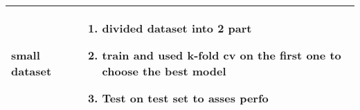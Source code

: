       \begin{table}[!h]
    \begin{center}
    \begin{tabular}{| m{8em}| m{15em}|}
    \hline
     \rowcolor{vert.g} \textbf{small dataset}     &  \begin{enumerate}
                                                        \item divided dataset into 2 part
                                                        \item train and used k-fold cv on the first one to choose the best model
                                                        \item Test on test set to asses perfo
                                                 \end{enumerate}\\ \hline 
    \end{tabular}
    \end{center}
    \end{table}
    